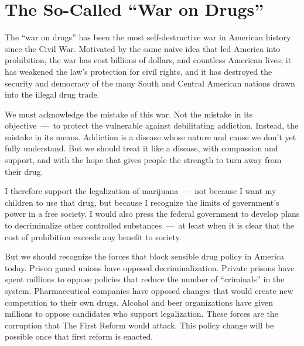 \section{The So-Called ``War on Drugs''}

The ``war on drugs'' has been the most self-destructive war in American history since the Civil War. Motivated by the same naive idea that led America into prohibition, the war has cost billions of dollars, and countless American lives; it has weakened the law's protection for civil rights, and it has destroyed the security and democracy of the many South and Central American nations drawn into the illegal drug trade.

We must acknowledge the mistake of this war. Not the mistake in its objective~---~to protect the vulnerable against debilitating addiction. Instead, the mistake in its means. Addiction is a disease whose nature and cause we don't yet fully understand. But we should treat it like a disease, with compassion and support, and with the hope that gives people the strength to turn away from their drug.

I therefore support the legalization of marijuana~---~not because I want my children to use that drug, but because I recognize the limits of government's power in a free society. I would also press the federal government to develop plans to decriminalize other controlled substances~---~at least when it is clear that the cost of prohibition exceeds any benefit to society.

But we should recognize the forces that block sensible drug policy in America today. Prison guard unions have opposed decriminalization. Private prisons have spent millions to oppose policies that reduce the number of ``criminals'' in the system. Pharmaceutical companies have opposed changes that would create new competition to their own drugs. Alcohol and beer organizations have given millions to oppose candidates who support legalization. These forces are the corruption that The First Reform would attack. This policy change will be possible once that first reform is enacted.
